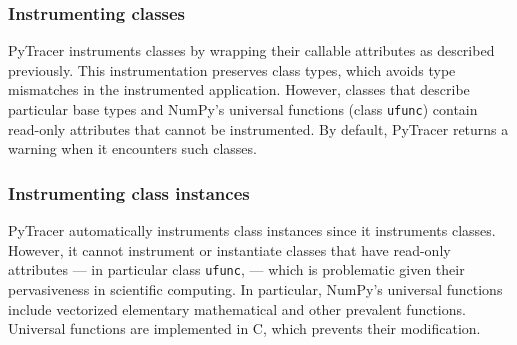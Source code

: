 \documentclass[10pt,journal,compsoc]{IEEEtran}
\newcommand{\pytracer}[0]{PyTracer\xspace}
\begin{document}




\subsubsection{Instrumenting classes}

\pytracer instruments classes by wrapping their callable attributes as described
previously. This instrumentation preserves class types, which avoids type
mismatches in the instrumented application. However, classes that describe
particular base types and NumPy's universal functions (class \texttt{ufunc})
contain read-only attributes that cannot be instrumented. By default, \pytracer
returns a warning when it encounters such classes. 

\subsubsection{Instrumenting class instances}

\pytracer automatically instruments class instances since it instruments
classes. However, it cannot instrument or instantiate classes that have
read-only attributes --- in particular class \texttt{ufunc}, --- which is
problematic given their pervasiveness in scientific computing. In particular,
NumPy's universal functions include vectorized elementary mathematical and other
prevalent functions. Universal functions are implemented in C, which prevents
their modification.
\end{document}
